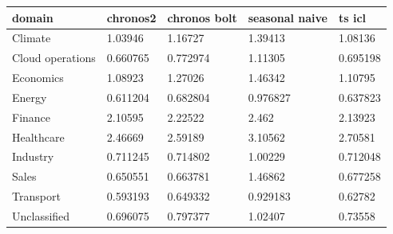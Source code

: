 \begin{tabular}{lllll}
\toprule
domain & chronos2 & chronos bolt & seasonal naive & ts icl \\
\midrule
Climate & 1.03946 & 1.16727 & 1.39413 & 1.08136 \\
Cloud operations & 0.660765 & 0.772974 & 1.11305 & 0.695198 \\
Economics & 1.08923 & 1.27026 & 1.46342 & 1.10795 \\
Energy & 0.611204 & 0.682804 & 0.976827 & 0.637823 \\
Finance & 2.10595 & 2.22522 & 2.462 & 2.13923 \\
Healthcare & 2.46669 & 2.59189 & 3.10562 & 2.70581 \\
Industry & 0.711245 & 0.714802 & 1.00229 & 0.712048 \\
Sales & 0.650551 & 0.663781 & 1.46862 & 0.677258 \\
Transport & 0.593193 & 0.649332 & 0.929183 & 0.62782 \\
Unclassified & 0.696075 & 0.797377 & 1.02407 & 0.73558 \\
\bottomrule
\end{tabular}

